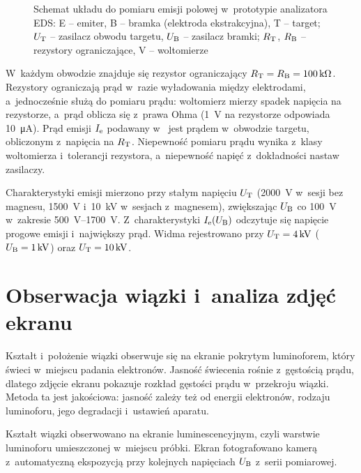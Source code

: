 \begin{figure}[htbp]
  \centering
  \caption{Schemat układu do pomiaru emisji polowej w~prototypie analizatora EDS:
    E -- emiter, B -- bramka (elektroda ekstrakcyjna), T -- target;
    $U_\mathrm{T}$ -- zasilacz obwodu targetu, $U_\mathrm{B}$ -- zasilacz bramki;
    $R_\mathrm{T}$, $R_\mathrm{B}$ -- rezystory ograniczające, V -- woltomierze
}
  \label{fig:uklad-pomiarowy}
\end{figure}

W~każdym obwodzie znajduje się rezystor ograniczający
$R_\mathrm{T} = R_\mathrm{B} = \SI{100}{\kilo\ohm}$. Rezystory ograniczają prąd w~razie
wyładowania między elektrodami, a~jednocześnie służą do pomiaru prądu:
woltomierz mierzy spadek napięcia na rezystorze, a~prąd oblicza się
z~prawa Ohma (\SI{1}{\volt} na rezystorze odpowiada
\SI{10}{\micro\ampere}). Prąd emisji $I_\mathrm{e}$ podawany w~
jest prądem w~obwodzie targetu, obliczonym z~napięcia na $R_\mathrm{T}$.
Niepewność pomiaru prądu wynika z~klasy woltomierza i~tolerancji
rezystora, a~niepewność napięć z~dokładności nastaw zasilaczy.

Charakterystyki emisji mierzono przy stałym napięciu $U_\mathrm{T}$
(\SI{2000}{\volt} w~sesji bez magnesu, \SI{1500}{\volt}
i~\SI{10}{\kilo\volt} w~sesjach z~magnesem), zwiększając $U_\mathrm{B}$ co \SI{100}{\volt} w~zakresie
\SIrange{500}{1700}{\volt}. Z~charakterystyki $I_\mathrm{e}(U_\mathrm{B})$ odczytuje się
napięcie progowe emisji i~największy prąd. Widma rejestrowano przy
$U_\mathrm{T} = \SI{4}{\kilo\volt}$ ($U_\mathrm{B} = \SI{1}{\kilo\volt}$) oraz
$U_\mathrm{T} = \SI{10}{\kilo\volt}$.

\section{Obserwacja wiązki i~analiza zdjęć ekranu}
\label{sec:analiza-zdjec}

\begin{przeniesione}
Kształt i~położenie wiązki obserwuje się na ekranie pokrytym luminoforem,
który świeci w~miejscu padania elektronów. Jasność świecenia rośnie
z~gęstością prądu, dlatego zdjęcie ekranu pokazuje rozkład gęstości
prądu w~przekroju wiązki. Metoda ta jest jakościowa: jasność zależy też
od energii elektronów, rodzaju luminoforu, jego degradacji i~ustawień
aparatu.
\end{przeniesione}

Kształt wiązki obserwowano na ekranie luminescencyjnym, czyli warstwie
luminoforu umieszczonej w~miejscu próbki. Ekran
fotografowano kamerą z~automatyczną ekspozycją przy kolejnych
napięciach $U_\mathrm{B}$ z~serii pomiarowej.

